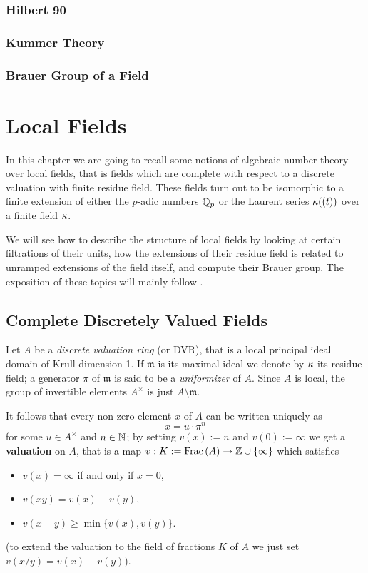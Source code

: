\documentclass[a4paper, oneside]{memoir}
\begin{document}
\subsection{Hilbert 90}
\subsection{Kummer Theory}
\subsection{Brauer Group of a Field}

\chapter{Local Fields}
In this chapter we are going to recall some notions of algebraic number theory over local fields, that is fields which are complete with respect to a discrete valuation with finite
residue field. These fields turn out to be isomorphic to a finite extension of either the $p$-adic numbers $\mathbb{Q}_p$ or the Laurent series $\kappa((t))$ over a finite field $\kappa$.

We will see how to describe the structure of local fields by looking at certain filtrations of their units, how the extensions of their residue field is related to unramped
extensions of the field itself, and compute their Brauer group. The exposition of these topics will mainly follow \cite{SerreCL}.

\section{Complete Discretely Valued Fields}
Let $A$ be a \textit{discrete valuation ring} (or DVR), that is a local principal ideal domain of Krull dimension 1. If $\mathfrak{m}$ is its maximal ideal we denote by $\kappa$ its
residue field; a generator $\pi$ of $\mathfrak{m}$ is said to be a \textit{uniformizer} of $A$. Since $A$ is local, the group of invertible elements $A^\times$ is just
$A\setminus\mathfrak{m}$.

It follows that every non-zero element $x$ of $A$ can be written uniquely as
\begin{equation}\label{eq:DVR}
    x=u\cdot\pi^n
\end{equation}
for some $u\in A^\times$ and $n\in\mathbb{N}$; by setting $v(x):=n$ and $v(0):=\infty$ we get a \textbf{valuation} on $A$, that is a map $v:K:=\operatorname{Frac}{(A)}\to\mathbb{Z}\cup\{\infty\}$ which satisfies
\begin{itemize}
    \item $v(x)=\infty$ if and only if $x=0$,
    \item $v(xy)=v(x)+v(y)$,
    \item $v(x+y)\geq\min\{v(x),v(y)\}$.
\end{itemize}
(to extend the valuation to the field of fractions $K$ of $A$ we just set $v(x/y)=v(x)-v(y)$).
\end{document}
